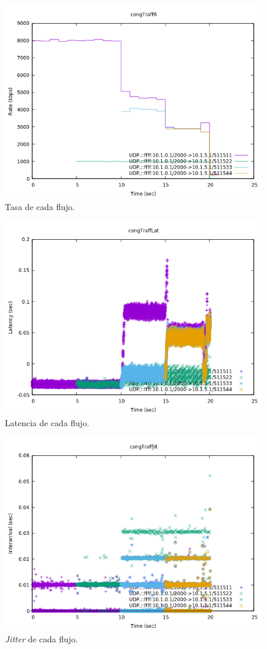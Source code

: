 \documentclass[11pt]{article}
\begin{document}
        \begin{figure}
            \centering
            \includegraphics[width=0.6\linewidth]{congTraffR.png}
            \caption{Tasa de cada flujo.}
            \label{fig:congR}
        \end{figure}

        \begin{figure}
            \centering
            \includegraphics[width=0.6\linewidth]{congTraffLat.png}
            \caption{Latencia de cada flujo.}
            \label{fig:congLat}
        \end{figure}

        \begin{figure}
            \centering
            \includegraphics[width=0.6\linewidth]{congTraffJit.png}
            \caption{\textit{Jitter} de cada flujo.}
            \label{fig:congJit}
        \end{figure}
\end{document}
